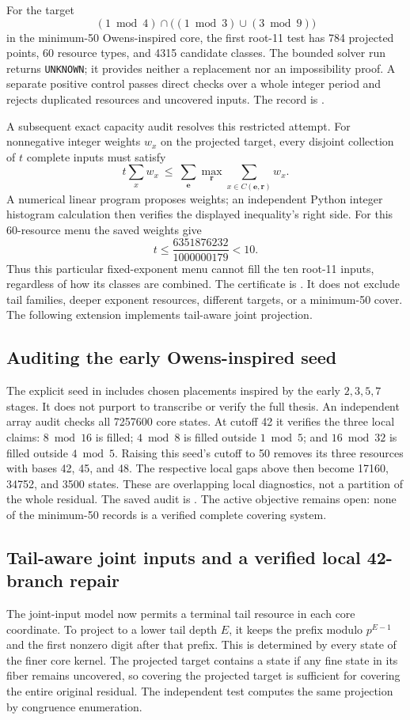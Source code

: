 \documentclass[11pt]{article}
\begin{document}
For the target
\[
 (1\bmod4)\cap\bigl((1\bmod3)\cup(3\bmod9)\bigr)
\]
in the minimum-50 Owens-inspired core, the first root-11 test has 784
projected points, 60 resource types, and 4315 candidate classes. The bounded
solver run returns \texttt{UNKNOWN}; it provides neither a replacement nor
an impossibility proof. A separate positive control passes direct checks
over a whole integer period and rejects duplicated resources and uncovered
inputs. The record is .

A subsequent exact capacity audit resolves this restricted attempt. For
nonnegative integer weights $w_x$ on the projected target, every disjoint
collection of $t$ complete inputs must satisfy
\[
 t\sum_x w_x\ \leq\ \sum_{\mathbf e}
       \max_{\mathbf r}\sum_{x\in C(\mathbf e,\mathbf r)}w_x.
\]
A numerical linear program proposes weights; an independent Python integer
histogram calculation then verifies the displayed inequality's right side.
For this 60-resource menu the saved weights give
\[
 t\leq\frac{6351876232}{1000000179}<10.
\]
Thus this particular fixed-exponent menu cannot fill the ten root-11 inputs,
regardless of how its classes are combined. The certificate is
. It does not exclude
tail families, deeper exponent resources, different targets, or a
minimum-50 cover. The following extension implements tail-aware joint projection.

\subsection{Auditing the early Owens-inspired seed}
The explicit seed in  includes chosen
placements inspired by the early $2,3,5,7$ stages. It does not purport to
transcribe or verify the full thesis. An independent array audit checks all
7257600 core states. At cutoff 42 it verifies the three local claims:
$8\bmod16$ is filled; $4\bmod8$ is filled outside $1\bmod5$; and
$16\bmod32$ is filled outside $4\bmod5$.
Raising this seed's cutoff to 50 removes its three resources with bases
42, 45, and 48. The respective local gaps above then become 17160, 34752,
and 3500 states. These are overlapping local diagnostics, not a partition
of the whole residual. The saved audit is
. The active objective remains open:
none of the minimum-50 records is a verified complete covering system.

\subsection{Tail-aware joint inputs and a verified local 42-branch repair}
The joint-input model now permits a terminal tail resource in each core
coordinate. To project to a lower tail depth $E$, it keeps the prefix modulo
$p^{E-1}$ and the first nonzero digit after that prefix. This is determined
by every state of the finer core kernel. The projected target contains a
state if any fine state in its fiber remains uncovered, so covering the
projected target is sufficient for covering the entire original residual.
The independent test computes the same projection by congruence enumeration.
\end{document}
